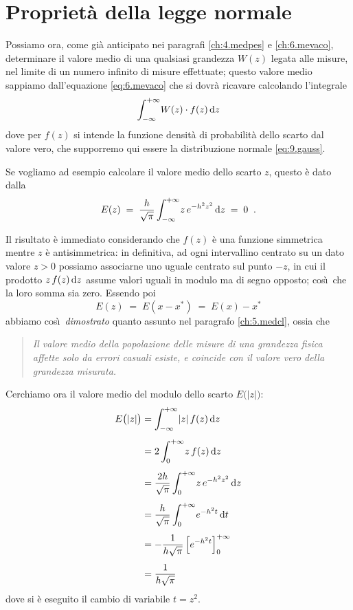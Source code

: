 \section{Propriet\`a della legge normale}
Possiamo ora, come gi\`a anticipato nei paragrafi
\ref{ch:4.medpes} e \ref{ch:6.mevaco}, determinare il valore
medio di una qualsiasi grandezza $W(z)$ legata alle misure,
nel limite di un numero infinito di misure effettuate;
questo valore medio sappiamo dall'equazione
\eqref{eq:6.mevaco} che si dovr\`a ricavare calcolando
l'integrale
\begin{equation*}
  \int_{- \infty}^{+ \infty} \! W(z) \cdot f(z) \, \mathrm{d}
    z
\end{equation*}
dove per $f(z)$ si intende la funzione densit\`a di
probabilit\`a dello scarto dal valore vero, che supporremo
qui essere la distribuzione normale \eqref{eq:9.gauss}.

Se vogliamo ad esempio calcolare il valore medio dello
scarto $z$, questo \`e dato dalla
\begin{equation*}
  E(z) \; = \; \frac{h}{\sqrt{\pi}}
  \int_{- \infty}^{+ \infty} \!
  z \, e^{-h^2 z^2} \, \mathrm{d} z \; = \; 0 \;\; .
\end{equation*}

Il risultato \`e immediato considerando che $f(z)$ \`e una
funzione simmetrica mentre $z$ \`e antisimmetrica: in
definitiva, ad ogni intervallino centrato su un dato valore
$z>0$ possiamo associarne uno uguale centrato sul punto
$-z$, in cui il prodotto $z \, f(z) \, \mathrm{d} z $ assume valori
uguali in modulo ma di segno opposto; cos\`\i\ che la loro
somma sia zero.  Essendo poi
\begin{equation*}
  E(z) \; = \; E \left( x - x^* \right) \; = \;
  E(x) - x^*
\end{equation*}
abbiamo cos\`\i\ \emph{dimostrato} quanto assunto nel
paragrafo \ref{ch:5.medcl}, ossia che
\begin{quote}
  \textit{Il valore medio della popolazione delle misure di
    una grandezza fisica affette solo da errori casuali
    esiste, e coincide con il valore vero della grandezza
    misurata.}
\end{quote}

%
Cerchiamo ora il valore medio del modulo dello scarto $ E
\bigl( | z | \bigr) $:
\begin{align*}
  E \bigl( | z | \bigr) &=
    \int_{- \infty}^{+ \infty} \! |z| \, f(z) \, \mathrm{d} z
    \\[1ex]
  &= 2 \int_0^{+ \infty} \! z \, f(z) \, \mathrm{d} z
    \\[1ex]
  &= \frac{2h}{\sqrt{\pi}} \int_0^{+\infty} \! z \,
    e^{-h^2 z^2} \, \mathrm{d} z \\[1ex]
  &= \frac{h}{\sqrt{\pi}} \int_0^{+\infty} \!
    e^{-h^2 t} \, \mathrm{d} t \\[1ex]
  &= - \frac{1}{h\sqrt{\pi}} \left[ e^{-h^2 t}
     \right]_0^{+\infty} \\[1ex]
  &= \frac{1}{h\sqrt{\pi}}
\end{align*}
dove si \`e eseguito il cambio di variabile $t=z^2$.

